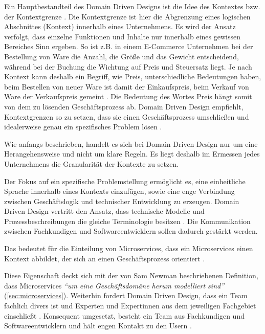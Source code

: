 Ein Hauptbestandteil des Domain Driven Designs ist die Idee des Kontextes bzw. der Kontextgrenze \parencite[vgl.][]{fowler_boundedContext_2014}. Die Kontextgrenze ist hier die Abgrenzung eines logischen Abschnittes (Kontext) innerhalb eines Unternehmens. Es wird der Ansatz verfolgt, dass einzelne Funktionen und Inhalte nur innerhalb eines gewissen Bereiches Sinn ergeben. So ist z.B. in einem E-Commerce Unternehmen bei der Bestellung von Ware die Anzahl, die Größe und das Gewicht entscheidend, während bei der Buchung die Wichtung auf Preis und Steuersatz liegt. Je nach Kontext kann deshalb ein Begriff, wie Preis, unterschiedliche Bedeutungen haben, beim Bestellen von neuer Ware ist damit der Einkaufspreis, beim Verkauf von Ware der Verkaufspreis gemeint \parencite[vgl.][S. 24 ff.]{evans_domain-driven_2003}. Die Bedeutung des Wortes Preis hängt somit von dem zu lösenden Geschäftsprozess ab. Domain Driven Design empfiehlt, Kontextgrenzen so zu setzen, dass sie einen Geschäftsprozess umschließen und idealerweise genau ein spezifisches Problem lösen \parencite[vgl.][Kap. 4.3]{wolff_microservices_2018}.

Wie anfangs beschrieben, handelt es sich bei Domain Driven Design nur um eine Herangehensweise und nicht um klare Regeln. Es liegt deshalb im Ermessen jedes Unternehmens die Granularität der Kontexte zu setzen.

Der Fokus auf ein spezifische Problemstellung ermöglicht es, eine einheitliche Sprache innerhalb eines Kontexts einzufügen, sowie eine enge Verbindung zwischen Geschäftslogik und technischer Entwicklung zu erzeugen. Domain Driven Design vertritt den Ansatz, dass technische Modelle und Prozessbeschreibungen die gleiche Terminologie besitzen \parencite[vgl.][S. 24 ff.]{evans_domain-driven_2003}. Die Kommunikation zwischen Fachkundigen und Softwareentwicklern sollen dadurch gestärkt werden.

Das bedeutet für die Einteilung von Microservices, dass ein Microservices einen Kontext abbildet, der sich an einen Geschäftsprozess orientiert \parencites[vgl.][Kap. 4.3]{wolff_microservices_2018}[vgl.][Kap. 4]{newman_monolith_2019}.

Diese Eigenschaft deckt sich mit der von Sam Newman beschriebenen Definition, dass Microservices \textit{\enquote{um eine Geschäftsdomäne herum modelliert sind}} (\cref{sec:microservices}). Weiterhin fordert Domain Driven Design, dass ein Team fachlich divers ist und Experten und Expertinnen aus dem jeweiligen Fachgebiet einschließt \parencite[vgl.][S. 32 ff.]{evans_domain-driven_2003}. 
Konsequent umgesetzt, besteht ein Team aus Fachkundigen und Softwareentwicklern und hält engen Kontakt zu den Usern \parencites[vgl.][Kap. 4.3]{wolff_microservices_2018}.

